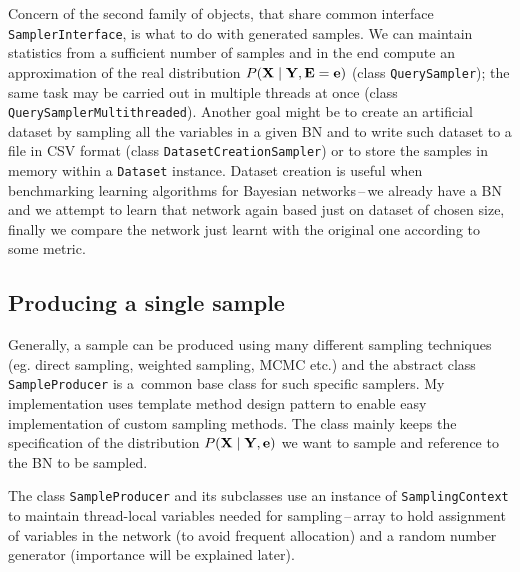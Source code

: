 \documentclass[english,cover]{fitthesis} %
\newcommand{\srccode}[1]{{\tt #1}}         %
\newcommand{\vars}[1]{{\bold{#1}}}         %
\begin{document}
Concern of the second family of objects, that share common interface \srccode{SamplerInterface}, is what to do with generated samples. We can maintain statistics from a sufficient number of samples and in the end compute an approximation of the real distribution $P(\vars{X} \mid \vars{Y}, \vars{E} = \vars{e})$ (class \srccode{QuerySampler}); the same task may be carried out in multiple threads at once (class \srccode{QuerySamplerMultithreaded}). Another goal might be to create an artificial dataset by sampling all the variables in a given BN and to write such dataset to a file in CSV format (class \srccode{DatasetCreationSampler}) or to store the samples in memory within a \srccode{Dataset} instance. Dataset creation is useful when benchmarking learning algorithms for Bayesian networks\,--\,we already have a BN and we attempt to learn that network again based just on dataset of chosen size, finally we compare the network just learnt with the original one according to some metric.



\subsection{Producing a single sample}
Generally, a sample can be produced using many different sampling techniques (eg. direct sampling, weighted sampling, MCMC etc.) and the abstract class \srccode{SampleProducer} is a~common base class for such specific samplers. My implementation uses template method design pattern to enable easy implementation of custom sampling methods. The class mainly keeps the specification of the distribution $P(\vars{X} \mid \vars{Y}, \vars{e})$ we want to sample and reference to the BN to be sampled.

The class \srccode{SampleProducer} and its subclasses use an instance of \srccode{SamplingContext} to maintain thread-local variables needed for sampling\,--\,array to hold assignment of variables in the network (to avoid frequent allocation) and a random number generator (importance will be explained later).
\end{document}
